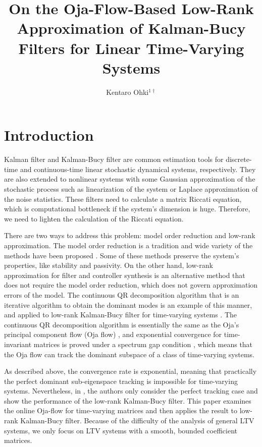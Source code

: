 \documentclass[fleqn,10pt]{SICE_FES26}
\title{On the Oja-Flow-Based Low-Rank Approximation of Kalman-Bucy Filters for Linear Time-Varying Systems
}
\author{Kentaro Ohki${}^{1\dagger}$}
\begin{document}
\maketitle


\section{Introduction}

Kalman filter \cite{kalman1960nal} and Kalman-Bucy filter \cite{kalman1961nrl} are common estimation tools for discrete-time and continuous-time linear stochastic dynamical systems, respectively.  
They are also extended to nonlinear systems with some Gaussian approximation of the stochastic process such as linearization of the system or Laplace approximation of the noise statistics. 
These filters need to calculate a matrix Riccati equation, which is computational bottleneck if the system's dimension is huge.  
Therefore, we need to lighten the calculation of the Riccati equation. 

There are two ways to address this problem: model order reduction and low-rank approximation. 
The model order reduction is a tradition and wide variety of the methods have been proposed \cite{antoulas2005approximation,AntoulasBeattieGuegercin2020,breiten2021balancing}. 
Some of these methods preserve the system's properties, like stability and passivity.  
On the other hand, low-rank approximation for filter and controller synthesis is an alternative method that does not require the model order reduction, which does not govern approximation errors of the model. 
The continuous QR decomposition algorithm that is an iterative algorithm to obtain the dominant modes is an example of this manner, and applied to low-rank Kalman-Bucy filter for time-varying systems \cite{tranninger2022detectability}. 
The continuous QR decomposition algorithm is essentially the same as the Oja's principal component flow (Oja flow) \cite{TsuzukiOhki2025global}, and exponential convergence for time-invariant matrices is proved under a spectrum gap condition \cite{kuo2025asymptotic,TsuzukiOhki2025global}, which means that the Oja flow can track the dominant subspace of a class of time-varying systems. 

As described above, the convergence rate is exponential, meaning that practically the perfect dominant sub-eigenspace tracking is impossible for time-varying systems. 
Nevertheless, in \cite{tranninger2022detectability}, the authors only consider the perfect tracking case and show the performance of the low-rank Kalman-Bucy filter.  
This paper examines the online Oja-flow for time-varying matrices and then applies the result to low-rank Kalman-Bucy filter. 
Because of the difficulty of the analysis of general LTV systems, we only focus on LTV systems with a smooth, bounded coefficient matrices.  
\end{document}
